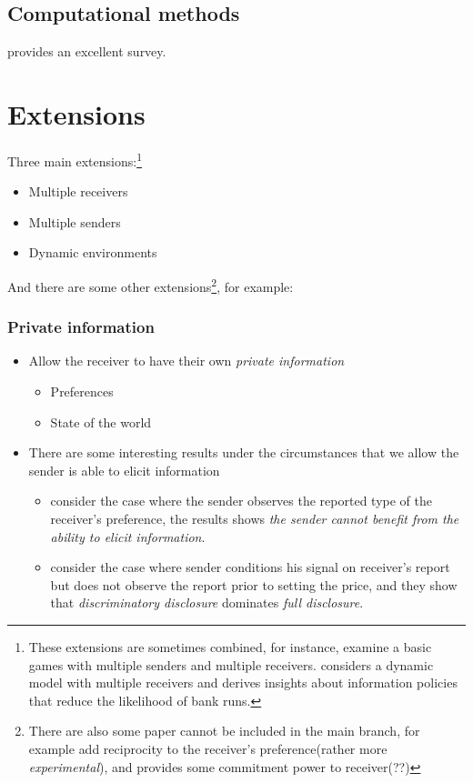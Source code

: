 \documentclass[12pt,letterpaper]{article}
\theoremstyle{definition}   %
\begin{document}
\subsection{Computational methods}

\cite{dughmi2017algorithmic} provides an excellent survey.

\section{Extensions}\label{Section 4}
Three main extensions:\footnote{These extensions are sometimes combined, for instance, \cite{koessler2021interactive} examine a basic games with multiple senders and multiple receivers. \cite{ely2017beeps} considers a dynamic model with multiple receivers and derives insights about information policies that reduce the likelihood of bank runs.}
\begin{itemize}
	\item Multiple receivers
	\item Multiple senders
	\item Dynamic environments
\end{itemize}        

And there are some other extensions\footnote{There are also some paper cannot be included in the main branch, for example \cite{au2018bayesian} add reciprocity to the receiver's preference(rather more \emph{experimental}), and \cite{tsakas2021resisting} provides some commitment power to receiver(??)}, for example:

\subsubsection*{Private information}
\begin{itemize}
	\item Allow the receiver to have their own \emph{private information}
	\begin{itemize}
		\item Preferences \citep{kolotilin2018optimal,rayo2010optimal}
		\item State of the world \citep{guo2019interval}
	\end{itemize}
	\item There are some interesting results under the circumstances that we allow the sender is able to elicit information
	\begin{itemize}
		\item \cite{kolotilin2017persuasion} consider the case where the sender observes the reported type of the receiver's preference, the results shows \emph{the sender cannot benefit from the ability to elicit information}.
		\item \cite{li2017discriminatory} consider the case where sender conditions his signal on receiver's report but does not observe the report prior to setting the price, and they show that \emph{discriminatory disclosure} dominates \emph{full disclosure}.
	\end{itemize}		
\end{itemize}
\end{document}
